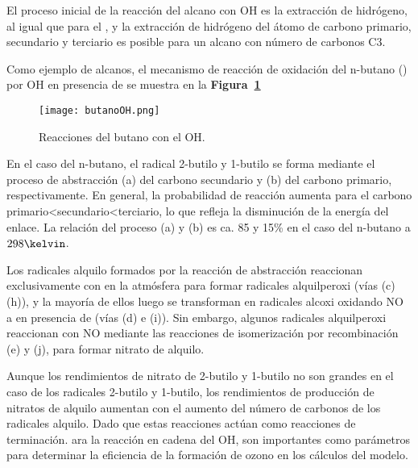 {El proceso inicial de la reacción del alcano con OH es la extracción de hidrógeno, al igual que para el , y la extracción de hidrógeno del átomo de carbono primario, secundario y terciario es posible para un alcano con número de carbonos C3.

Como ejemplo de alcanos, el mecanismo de reacción de oxidación del n-butano () por OH en presencia de   se muestra en la \textbf{Figura~\ref{butanOH}}

\begin{figure}[htbp]
\begin{center}
\texttt{[image: butanoOH.png]}
\caption{Reacciones del  butano con el OH.}
\label{butanOH}
\end{center}
\end{figure}

En el caso del n-butano, el radical 2-butilo y 1-butilo se forma mediante el proceso de abstracción (a) del carbono secundario y (b) del carbono primario, respectivamente. En general, la probabilidad de reacción aumenta para el carbono primario<secundario<terciario, lo que refleja la disminución de la energía del enlace. La relación del proceso (a) y (b) es ca. 85 y 15\% en el caso del n-butano a $298\kelvin$.

Los radicales alquilo formados por la reacción de abstracción reaccionan exclusivamente con  en la atmósfera para formar radicales alquilperoxi (vías (c) (h)), y la mayoría de ellos luego se transforman en radicales alcoxi oxidando NO a  en presencia de  (vías (d) e (i)). Sin embargo, algunos radicales alquilperoxi reaccionan con NO mediante las reacciones de isomerización por recombinación (e) y (j), para formar nitrato de alquilo.

Aunque los rendimientos de nitrato de 2-butilo y 1-butilo no son grandes en el caso de los radicales 2-butilo y 1-butilo, los rendimientos de producción de nitratos de alquilo aumentan con el aumento del número de carbonos de los radicales alquilo. Dado que estas reacciones actúan como reacciones de terminación. ara la reacción en cadena del OH, son importantes como parámetros para determinar la eficiencia de la formación de ozono en los cálculos del modelo. 

}
